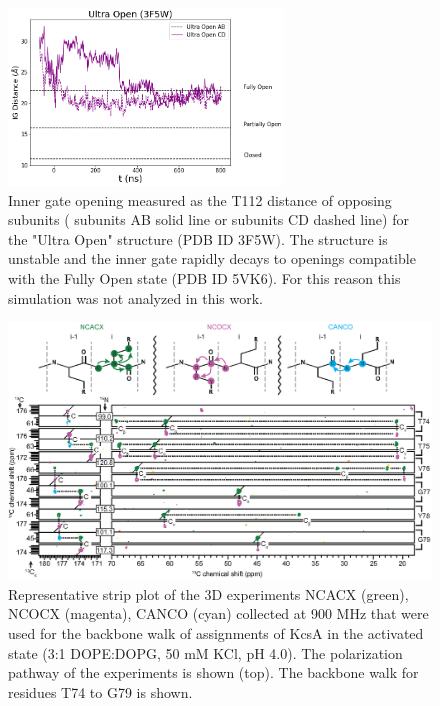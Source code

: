 \documentclass[%
 aip,
 amsmath,amssymb,
 preprint,%
]{revtex4-1}
\newcommand{\ca}{\ce{C_\alpha} }
\begin{document}
\begin{figure}[tbp]
	\includegraphics[width=0.65\textwidth]{figures_SI/IG_ultra_print.png}
	 \caption{\scriptsize
	 Inner gate opening measured as the  T112 \ca distance of opposing subunits ( subunits AB solid line or subunits CD dashed line) for the "Ultra Open" structure (PDB ID 3F5W). The structure is unstable and the inner gate rapidly decays to openings compatible with the Fully Open state (PDB ID 5VK6). For this reason this simulation was not analyzed in this work. }
\label{SI_IG_3F5W}
\end{figure} 

\begin{figure}[tbp]
	\includegraphics[width=\textwidth]{figures_SI/3D_SF_strip_plot_v2-01.eps}
	 \caption{\scriptsize
	 Representative strip plot of the 3D experiments NCACX (green), NCOCX (magenta), CANCO (cyan) collected at 900 MHz that were used for the backbone walk of assignments of KcsA in the activated state (3:1 DOPE:DOPG, 50 mM KCl, pH 4.0). The polarization pathway of the experiments is shown (top). The backbone walk for residues T74 to G79 is shown.
}
\label{SI_3D_strip_plot}
\end{figure}
\end{document}
